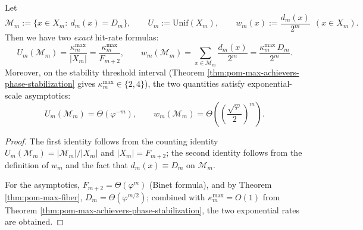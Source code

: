 \begin{corollary}\label{cor:pom-maxfiber-rarity-two-measures}
Let
\[
\mathcal{M}_m:=\{x\in X_m:\ d_m(x)=D_m\},
\qquad
U_m:=\mathrm{Unif}(X_m),
\qquad
w_m(x):=\frac{d_m(x)}{2^m}\ \ (x\in X_m).
\]
Then we have two \emph{exact} hit-rate formulas:
\[
U_m(\mathcal{M}_m)=\frac{\kappa_m^{\mathrm{max}}}{|X_m|}
=\frac{\kappa_m^{\mathrm{max}}}{F_{m+2}},
\qquad
w_m(\mathcal{M}_m)=\sum_{x\in\mathcal{M}_m}\frac{d_m(x)}{2^m}
=\frac{\kappa_m^{\mathrm{max}}\,D_m}{2^m}.
\]
Moreover, on the stability threshold interval (Theorem \ref{thm:pom-max-achievers-phase-stabilization} gives \(\kappa_m^{\mathrm{max}}\in\{2,4\}\)), the two quantities satisfy exponential-scale asymptotics:
\[
U_m(\mathcal{M}_m)=\Theta(\varphi^{-m}),
\qquad
w_m(\mathcal{M}_m)=\Theta\!\left(\left(\frac{\sqrt{\varphi}}{2}\right)^m\right).
\]
\end{corollary}
\begin{proof}
The first identity follows from the counting identity \(U_m(\mathcal{M}_m)=|\mathcal{M}_m|/|X_m|\) and \(|X_m|=F_{m+2}\); the second identity follows from the definition of \(w_m\) and the fact that \(d_m(x)\equiv D_m\) on \(\mathcal{M}_m\).
\par
For the asymptotics, \(F_{m+2}=\Theta(\varphi^m)\) (Binet formula), and by Theorem \ref{thm:pom-max-fiber}, \(D_m=\Theta(\varphi^{m/2})\); combined with \(\kappa_m^{\mathrm{max}}=O(1)\) from Theorem \ref{thm:pom-max-achievers-phase-stabilization}, the two exponential rates are obtained.
\end{proof}


